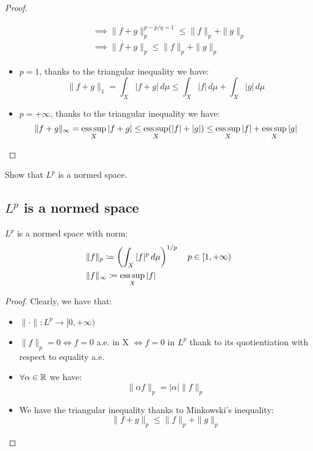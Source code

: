 \begin{proof}
\begin{itemize}
\begin{align*}
                & \implies \|f+g\|_p^{p-p/q=1} \leq \|f\|_p + \|g\|_p\\
                & \implies \|f+g\|_p \leq \|f\|_p + \|g\|_p
            \end{align*}
        \item $p=1$, thanks to the triangular inequality we have:
            \[ \|f+g\|_1 = \int_X |f+g| \, d\mu \leq \int_X |f| \, d\mu + \int_X |g| \, d\mu\]
        \item $p=+\infty$, thanks to the triangular inequality we have:
            \[ \|f+g\|_\infty = \operatorname*{ess\,sup}_X |f+g| \leq \operatorname*{ess\,sup}_X (|f|+|g|) \leq \operatorname*{ess\,sup}_X |f| + \operatorname*{ess\,sup}_X |g| \]
    \end{itemize}
\end{proof}


\question
Show that $L^p$ is a normed space.

\subsection{\texorpdfstring{$L^p$}{Lp} is a normed space}
$L^p$ is a normed space with norm:
\begin{align*}
    & \|f\|_p \coloneqq \left(\int_X |f|^p \, d\mu \right)^{1/p} \quad p\in[1,+\infty) \\
    & \|f\|_\infty \coloneqq \operatorname*{ess\,sup}_X |f| 
\end{align*}

\begin{proof}
    Clearly, we have that:
    \begin{itemize}
        \item $\|\cdot\|:L^p\to [0,+\infty)$
        \item $\|f\|_p = 0 \iff f=0$ a.e. in X $\iff f=0$ in $L^p$ thank to its quotientiation with respect to equality a.e.
        \item $\forall \alpha \in \mathbb{R}$ we have:
            \[ \|\alpha f\|_p = |\alpha| \|f\|_p \]
        \item We have the triangular inequality thanks to Minkowski's inequality:
            \[ \|f+g\|_p \leq \|f\|_p + \|g\|_p \]
    \end{itemize}
\end{proof}

